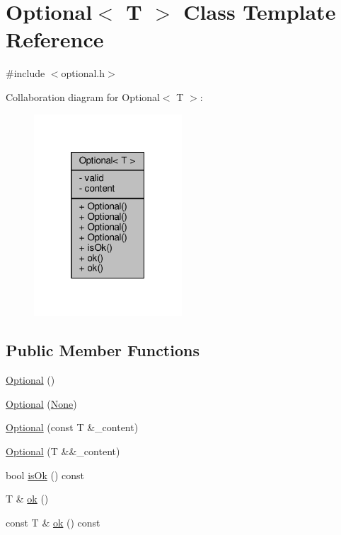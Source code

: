\hypertarget{classOptional}{}\section{Optional$<$ T $>$ Class Template Reference}
\label{classOptional}


{\ttfamily \#include $<$optional.\+h$>$}



Collaboration diagram for Optional$<$ T $>$\+:
\nopagebreak
\begin{figure}[H]
\begin{center}
\leavevmode
\includegraphics[width=157pt]{classOptional__coll__graph}
\end{center}
\end{figure}
\subsection*{Public Member Functions}
\begin{DoxyCompactItemize}
\item 
\hyperlink{classOptional_a7e936c9ca1669872d5e69ee5b2638088}{Optional} ()
\item 
\hyperlink{classOptional_a3b83f585aaa6a83591a3e32fe70c1087}{Optional} (\hyperlink{classNone}{None})
\item 
\hyperlink{classOptional_a78c5b279afd6400594f25961b927b2db}{Optional} (const T \&\+\_\+content)
\item 
\hyperlink{classOptional_a167b270716a2fed9d345625df0784700}{Optional} (T \&\&\+\_\+content)
\item 
bool \hyperlink{classOptional_a57a690d23369434ecc65d64e8a710b92}{is\+Ok} () const 
\item 
T \& \hyperlink{classOptional_a6527daf92b89333557d6b37938a965f2}{ok} ()
\item 
const T \& \hyperlink{classOptional_a1d5c2fc9361cd4944f8efda048003190}{ok} () const 
\end{DoxyCompactItemize}
